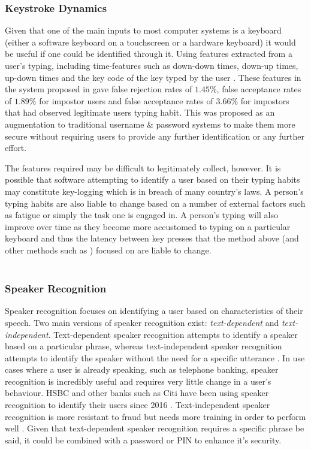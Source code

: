 \documentclass[12pt]{article}
\begin{document}
	\subsubsection{Keystroke Dynamics}
	\label{subsubsect:keystroke_dynamics}
	Given that one of the main inputs to most computer systems is a keyboard (either a software keyboard on a touchscreen or a hardware keyboard) it would be useful if one could be identified through it. Using features extracted from a user's typing, including time-features such as down-down times, down-up times, up-down times and the key code of the key typed by the user \citep{typing_auth2005}. These features in the system proposed in \cite{typing_auth2005} gave false rejection rates of $1.45\%$, false acceptance rates of $1.89\%$ for impostor users and false acceptance rates of $3.66\%$ for impostors that had observed legitimate users typing habit. This was proposed as an augmentation to traditional username \& password systems to make them more secure without requiring users to provide any further identification or any further effort.
	
	The features required may be difficult to legitimately collect, however. It is possible that software attempting to identify a user based on their typing habits may constitute key-logging which is in breach of many country's laws. A person's typing habits are also liable to change based on a number of external factors such as fatigue or simply the task one is engaged in. A person's typing will also improve over time as they become more accustomed to typing on a particular keyboard and thus the latency between key presses that the method above (and other methods such as \cite{shepherd_ibm_keystroke_auth1995}) focused on are liable to change.
	\\
	\\
	\subsubsection{Speaker Recognition}
	\label{subsubsect:speaker_recognition}
	Speaker recognition focuses on identifying a user based on characteristics of their speech. Two main versions of speaker recognition exist: \emph{text-dependent} and \emph{text-independent}. Text-dependent speaker recognition attempts to identify a speaker based on a particular phrase, whereas text-independent speaker recognition attempts to identify the speaker without the need for a specific utterance \citep{microsoft_2006}. In use cases where a user is already speaking, such as telephone banking, speaker recognition is incredibly useful and requires very little change in a user's behaviour. HSBC and other banks such as Citi have been using speaker recognition to identify their users since 2016 \citep{kollewe_2016}. Text-independent speaker recognition is more resistant to fraud \citep{jain2004introduction} but needs more training in order to perform well \citep{microsoft_2006}. Given that text-dependent speaker recognition requires a specific phrase be said, it could be combined with a password or PIN to enhance it's security.
	
\end{document}
